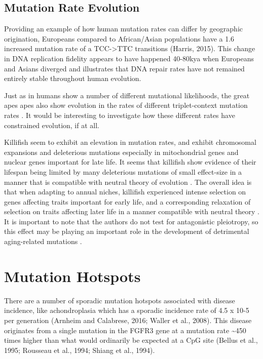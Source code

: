 \documentclass[]{book}
\begin{document}
\hypertarget{mutation-rate-evolution}{%
\subsection{Mutation Rate Evolution}\label{mutation-rate-evolution}}

Providing an example of how human mutation rates can differ by geographic origination, Europeans compared to African/Asian populations have a 1.6 increased mutation rate of a TCC-\textgreater{}TTC transitions (Harris, 2015). This change in DNA replication fidelity appears to have happened 40-80kya when Europeans and Asians diverged and illustrates that DNA repair rates have not remained entirely stable throughout human evolution.

Just as in humans show a number of different mutational likelihoods, the great apes apes also show evolution in the rates of different triplet-context mutation rates \citep{harris2017rapid}. It would be interesting to investigate how these different rates have constrained evolution, if at all.

Killifish seem to exhibit an elevation in mutation rates, and exhibit chromosomal expansions and deleterious mutations especially in mitochondrial genes and nuclear genes important for late life. It seems that killifish show evidence of their lifespan being limited by many deleterious mutations of small effect-size in a manner that is compatible with neutral theory of evolution \citep{ohta1973model, kimura1968evolutionary}. The overall idea is that when adapting to annual niches, killifish experienced intense selection on genes affecting traits important for early life, and a corresponding relaxation of selection on traits affecting later life in a manner compatible with neutral theory \citep{cui2019relaxed}. It is important to note that the authors do not test for antagonistic pleiotropy, so this effect may be playing an important role in the development of detrimental aging-related mutations \citep{charlesworth2000degeneration, williams1957pleiotropy}.

\hypertarget{mutation-hotspots}{%
\section{Mutation Hotspots}\label{mutation-hotspots}}

There are a number of sporadic mutation hotspots associated with disease incidence, like achondroplasia which has a sporadic incidence rate of 4.5 x 10-5 per generation (Arnheim and Calabrese, 2016; Waller et al., 2008). This disease originates from a single mutation in the FGFR3 gene at a mutation rate \textasciitilde{}450 times higher than what would ordinarily be expected at a CpG site (Bellus et al., 1995; Rousseau et al., 1994; Shiang et al., 1994).
\end{document}
